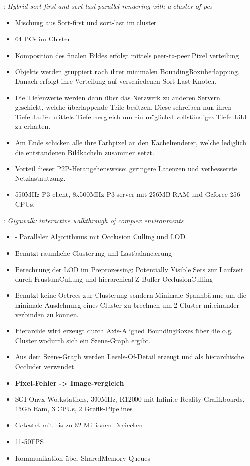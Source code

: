 \cite{samanta}: \textit{Hybrid sort-first and sort-last parallel rendering with a cluster of pcs}
\begin{itemize}
 \item Mischung aus Sort-first und sort-last im cluster
 \item 64 PCs im Cluster
 \item Komposition des finalen Bildes erfolgt mittels peer-to-peer Pixel verteilung
 \item Objekte werden gruppiert nach ihrer minimalen BoundingBoxüberlappung. Danach erfolgt ihre Verteilung auf verschiedenen Sort-Last Knoten.
 \item Die Tiefenwerte werden dann über das Netzwerk zu anderen Servern geschickt, welche überlappende Teile besitzen. Diese schreiben nun ihren Tiefenbuffer mittels Tiefenvergleich um ein möglichst vollständiges Tiefenbild zu erhalten.
 \item Am Ende schicken alle ihre Farbpixel an den Kachelrenderer, welche lediglich die entstandenen Bildkacheln zusammen setzt.
 \item Vorteil dieser P2P-Herangehensweise: geringere Latenzen und verbesserete Netzlastnutzung.
 \item 550MHz P3 client, 8x500MHz P3 server mit 256MB RAM und Geforce 256 GPUs.
\end{itemize}

\cite{baxter}: \textit{Gigawalk: interactive walkthrough of complex environments}
\begin{itemize}
 \item - Paralleler Algorithmus mit Occlusion Culling und LOD
 \item Benutzt räumliche Clusterung und Lastbalancierung
 \item Berechnung der LOD im Preprozessing; Potentially Visible Sets zur Laufzeit durch FrustumCullung und hierarchical Z-Buffer OcclusionCulling
 \item Benutzt keine Octrees zur Clusterung sondern Minimale Spannbäume um die minimale Ausdehnung eines Cluster zu brechnen um 2 Cluster miteinander verbinden zu können.
 \item Hierarchie wird erzeugt durch Axis-Aligned BoundingBoxes über die o.g. Cluster wodurch sich ein Szene-Graph ergibt.
 \item Aus dem Szene-Graph werden Levels-Of-Detail erzeugt und als hierarchische Occluder verwendet
 \item \textbf{Pixel-Fehler -> Image-vergleich}
 \item SGI Onyx Workstations, 300MHz, R12000 mit Infinite Reality Grafikboards, 16Gb Ram, 3 CPUs, 2 Grafik-Pipelines
 \item Getestet mit bis zu 82 Millionen Dreiecken
 \item 11-50FPS
 \item Kommunikation über SharedMemory Queues
\end{itemize}

